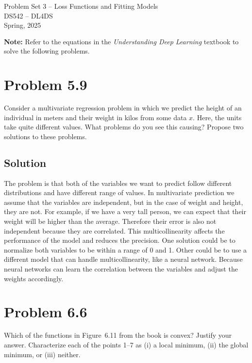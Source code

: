 \documentclass[10pt]{article}
\begin{document}
\begin{center}
    \LARGE {Problem Set 3 – Loss Functions and Fitting Models} \\[1em]
    \Large{DS542 – DL4DS} \\[0.5em]
    \large Spring, 2025
\end{center}

\vspace{2em}

\noindent\textbf{Note:} Refer to the equations in the \textit{Understanding Deep Learning} textbook to solve the following problems.

\vspace{2em}

\section*{Problem 5.9}
Consider a multivariate regression problem in which we predict the height of an individual in meters and their weight in kilos from some data $x$. Here, the units take quite different values. What problems do you see this causing? Propose two solutions to these problems.
 
\subsection{Solution}
The problem is that both of the variables we want to predict follow different distributions and have different range of values. In multivariate prediction we assume that the variables are independent, but in the case of weight and height, they are not. For example, if we have a very tall person, we can expect that their weight will be higher than the average. Therefore their error is also not independent because they are correlated. This multicollinearity affects the performance of the model and reduces the precision. One solution could be to normalize both variables to be within a range of 0 and 1. Other could be 
to use a different model that can handle multicollinearity, like a neural network. Because neural networks can learn the correlation between the variables and adjust the weights accordingly.

\vspace{5em}

\section*{Problem 6.6}
Which of the functions in Figure~6.11 from the book is convex? Justify your answer. Characterize each of the points 1--7 as (i) a local minimum, (ii) the global minimum, or (iii) neither.
\end{document}
